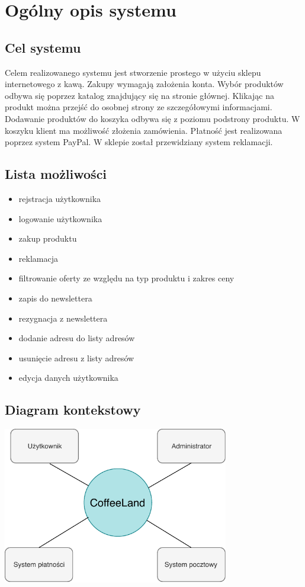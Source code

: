 \documentclass[10pt]{report}
\begin{document}
	
	\tableofcontents
	
	\setcounter{chapter}{0}	
	\setcounter{section}{0}	

	\chapter{Ogólny opis systemu}
	

		\section{Cel systemu}
	
		Celem realizowanego systemu jest stworzenie prostego w użyciu sklepu internetowego z kawą. Zakupy wymagają założenia konta. Wybór produktów odbywa się poprzez katalog znajdujący się na stronie głównej. Klikając na produkt można przejść do osobnej strony ze szczegółowymi informacjami. Dodawanie produktów do koszyka odbywa się z poziomu podstrony produktu. W koszyku klient ma możliwość złożenia zamówienia. Płatność jest realizowana poprzez system PayPal. W sklepie został przewidziany system reklamacji.
		
		\section{Lista możliwości}
		\begin{itemize}
			\item rejstracja użytkownika
			\item logowanie użytkownika
			\item zakup produktu
			\item reklamacja
			\item filtrowanie oferty ze względu na typ produktu i zakres ceny
			\item zapis do newslettera
			\item rezygnacja z newslettera
			\item dodanie adresu do listy adresów
			\item usunięcie adresu z listy adresów
			\item edycja danych użytkownika
		\end{itemize}
	

		\section{Diagram kontekstowy}
			\begin{center}
				\includegraphics[width=280pt]{kontekstowy.pdf}
			\end{center}
	
\end{document}
